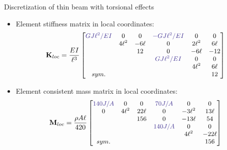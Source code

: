 \documentclass[aspectratio=169]{beamer}
\begin{document}
\begin{frame}{Discretization of thin beam with torsional effects}
  \begin{itemize}
    \item Element stiffness matrix in local coordinates:
          $$\small \mathbf{K}_{loc}=\frac{EI}{\ell^3} \begin{bmatrix}
              {\color{BlueViolet}GJ\ell^2/EI} & 0       & 0      & {\color{BlueViolet}-GJ\ell^2/EI} & 0       & 0     \\
                                              & 4\ell^2 & -6\ell & 0                                & 2\ell^2 & 6\ell \\
                                              &         & 12     & 0                                & -6\ell  & -12   \\
                                              &         &        & {\color{BlueViolet}GJ\ell^2/EI}  & 0       & 0     \\
                                              &         &        &                                  & 4\ell^2 & 6\ell \\ sym. & & & & & 12\end{bmatrix}
          $$
    \item Element consistent mass matrix in local coordinates:
          \[\small  \mathbf{M}_{loc} =\frac{\rho A\ell }{420}\begin{bmatrix}
              {\color{BlueViolet}140 J/A} & 0       & 0      & {\color{BlueViolet}70 J/A}  & 0        & 0       \\
              0                           & 4\ell^2 & 22\ell & 0                           & -3\ell^2 & 13\ell  \\
                                          &         & 156    & 0                           & -13\ell  & 54      \\
                                          &         &        & {\color{BlueViolet}140 J/A} & 0        & 0       \\
                                          &         &        &                             & 4\ell^2  & -22\ell \\
              sym.                        &         &        &                             &          & 156     \\
            \end{bmatrix} \]
  \end{itemize}
\end{frame}
\end{document}

